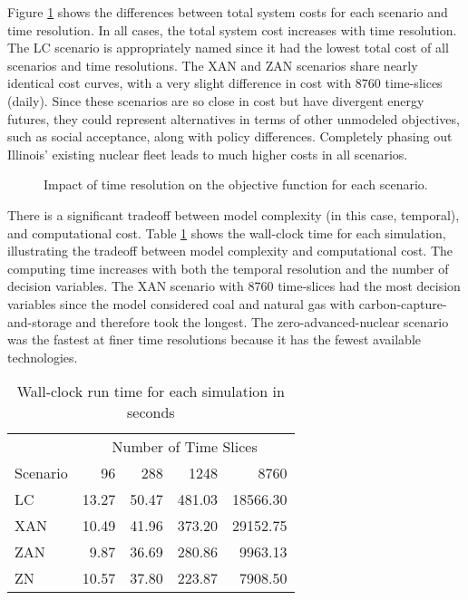 Figure \ref{fig:time_res_cost} shows the differences between total system costs
for each scenario and time resolution.
In all cases, the total system cost increases with time resolution. The \gls{LC}
scenario is appropriately named since it had the lowest total cost
of all scenarios and time resolutions. The \gls{XAN} and \gls{ZAN} scenarios share
nearly identical cost curves,
with a very slight difference in cost with 8760 time-slices (daily). Since these
scenarios are so close in cost but have divergent energy futures, they could represent
alternatives in terms of other unmodeled objectives, such as social acceptance,
along with policy differences. Completely phasing out Illinois' existing nuclear
fleet leads to much higher costs in all scenarios.

\begin{figure}[H]
  \centering
  \resizebox{0.75\columnwidth}{!}{}
  \caption{Impact of time resolution on the objective function for each scenario.}
  \label{fig:time_res_cost}
\end{figure}



There is a significant tradeoff between model complexity (in this case, temporal),
and computational cost. Table \ref{tab:time_res_clock} shows the
wall-clock time for each simulation, illustrating the tradeoff between model
complexity and computational cost.
The computing time increases with both the temporal resolution and the number of
decision variables. The \gls{XAN} scenario with 8760 time-slices had the most decision
variables since the model considered coal and natural gas with
carbon-capture-and-storage and therefore took the longest. The zero-advanced-nuclear
scenario was the fastest at finer time resolutions because it has the fewest
available technologies.

\begin{table}[H]
  \centering
  \caption{Wall-clock run time for each simulation in seconds}
  \label{tab:time_res_clock}
  \begin{tabular}{l*{4}{r}}
    \toprule
    & \multicolumn{4}{c}{Number of Time Slices}\\
    Scenario & 96 & 288 & 1248&8760\\
    \midrule
    LC &13.27&50.47&481.03&18566.30\\
    XAN &10.49&41.96&373.20&29152.75\\
    ZAN &9.87&36.69&280.86&9963.13\\
    ZN & 10.57&37.80&223.87&7908.50\\
    \bottomrule
  \end{tabular}
\end{table}


